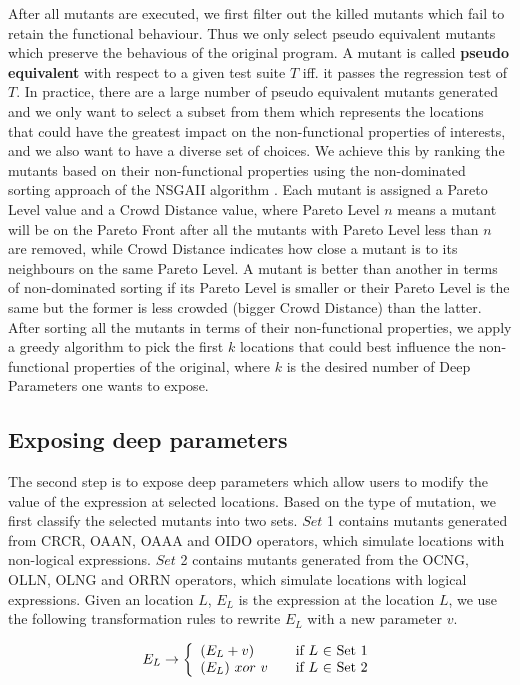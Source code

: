 After all mutants are executed, we first filter out the killed mutants which fail to retain the functional behaviour.  Thus we only select pseudo equivalent mutants which preserve the behavious of the original program. A mutant is called \textbf{pseudo equivalent} with respect to a given test suite $T$ iff. it passes the regression test of $T$.
In practice, there are a large number of pseudo equivalent mutants \cite{5477100} generated and we only want to select a subset from them which represents the locations that could have the greatest impact on the non-functional properties of interests, and we also want to have a diverse set of choices.  
We achieve this by ranking the mutants based on their non-functional properties using the non-dominated sorting approach of the NSGAII algorithm \cite{996017}. Each mutant is assigned a Pareto Level value and a Crowd Distance value, where Pareto Level $n$ means a mutant will be on the Pareto Front after all the mutants with Pareto Level less than $n$ are removed, while Crowd Distance indicates how close a mutant is to its neighbours on the same Pareto Level. A mutant is better than another in terms of non-dominated sorting if its Pareto Level is smaller or their Pareto Level is the same but the former is less crowded (bigger Crowd Distance) than the latter. After sorting all the mutants in terms of their non-functional properties, we apply a greedy algorithm to pick the first $k$ locations that could best influence the non-functional properties of the original, where $k$ is the desired number of Deep Parameters one wants to expose.

\subsection{Exposing deep parameters}
\label{exposing}
The second step is to expose deep parameters which allow users to modify the value of the expression at selected locations. Based on the type of mutation, we first classify the selected mutants into two sets. $Set$ 1 contains mutants generated from CRCR, OAAN, OAAA and OIDO operators, which simulate locations with non-logical expressions. $Set$ 2 contains mutants generated from the OCNG, OLLN, OLNG and ORRN operators, which simulate locations with logical expressions. 
Given an location $L$, $E_L$ is the expression at the location $L$, we use the following transformation rules to rewrite $E_L$ with a new parameter $v$.

\begin{equation}
 E_L \rightarrow \left\{
  \begin{array}{l l}
    (E_L + v) & \quad \text{if $L$ $\in$ Set 1}\\
    (E_L) \ xor \ v & \quad \text{if $L$ $\in$ Set 2}
    \end{array} \right.
\end{equation}

